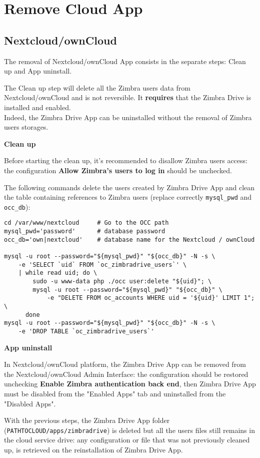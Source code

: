 \section{Remove Cloud App}
\subsection{Nextcloud/ownCloud}\label{subsec:NextcloudownCloudUninstallation}

    The removal of Nextcloud/ownCloud App consists in the separate steps: Clean up and App uninstall.

\begin{warning}
    The Clean up step will delete all the Zimbra users data from Nextcloud/ownCloud and is not reversible.
    It \textbf{requires} that the Zimbra Drive is installed and enabled.\\
    Indeed, the Zimbra Drive App can be uninstalled without the removal of Zimbra users storages.
\end{warning}

    \textbf{Clean up}

\begin{info}
    Before starting the clean up, it's recommended to disallow Zimbra users access:
    the configuration \textbf{Allow Zimbra's users to log in} should be unchecked.
\end{info}
    The following commands delete the users created by Zimbra Drive App and clean the table containing
    references to Zimbra users (replace correctly \texttt{mysql\_pwd} and \texttt{occ\_db}):

\begin{verbatim}
cd /var/www/nextcloud     # Go to the OCC path
mysql_pwd='password'      # database password
occ_db='own|nextcloud'    # database name for the Nextcloud / ownCloud

mysql -u root --password="${mysql_pwd}" "${occ_db}" -N -s \
    -e 'SELECT `uid` FROM `oc_zimbradrive_users`' \
    | while read uid; do \
        sudo -u www-data php ./occ user:delete "${uid}"; \
        mysql -u root --password="${mysql_pwd}" "${occ_db}" \
            -e "DELETE FROM oc_accounts WHERE uid = '${uid}' LIMIT 1"; \
      done
mysql -u root --password="${mysql_pwd}" "${occ_db}" -N -s \
    -e 'DROP TABLE `oc_zimbradrive_users`'
\end{verbatim}

    \textbf{App uninstall}

    In Nextcloud/ownCloud platform, the Zimbra Drive App can be removed from the Nextcloud/ownCloud Admin Interface:
    the configuration should be restored unchecking \textbf{Enable Zimbra authentication back end},
    then Zimbra Drive App must be disabled from the "Enabled Apps" tab and uninstalled from the "Disabled Apps".

    With the previous steps, the Zimbra Drive App folder (\texttt{PATH\textunderscore TO\textunderscore CLOUD/apps/zimbradrive})
    is deleted but all the users files still remains in the cloud service drive:
    any configuration or file that was not previously cleaned up, is retrieved on the reinstallation of Zimbra Drive App.
